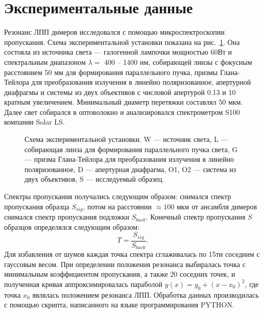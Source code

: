 \section{Экспериментальные данные}

Резонанс ЛПП димеров исследовался с помощью микроспектроскопии пропускания. Схема экспериментальной установки показана на рис.~\ref{img:expsetup}. Она состояла из источника света --- галогенной лампочки мощностью 60Вт и спектральным диапазоном $ \lambda =  $ 400 -- 1400 нм, собирающей линзы с фокусным расстоянием 50 мм для формирования параллельного пучка, призмы Глана-Тейлора для преобразования излучения в линейно поляризованное, апертурной диафрагмы и системы из двух объективов с числовой апертурой 0.13 и 10 кратным увеличением. Минимальный диаметр перетяжки составлял 50 мкм. Далее свет собирался в оптоволокно и анализировался спектрометром S100 компании Solar LS.
\begin{figure}
\caption{Схема экспериментальной установки. W --- источник света, L --- собирающая линза для формирования параллельного пучка света, G --- призма Глана-Тейлора для преобразования излучения в линейно поляризованное, D --- апертурная диафрагма, O1, O2 --- система из двух объективов, S --- исследуемый образец. }
\label{img:expsetup}
\end{figure}
Спектры пропускания получались следующим образом: снимался спектр пропускания образца $ S_{sig} $, потом на расстоянии $ \approx 100 $ мкм от ансамбля димеров снимался спектр пропускания подложки $ S_{back} $. Конечный спектр пропускания $ S $ образцов определялся следующим образом:
\begin{equation}
T = \frac{S_{sig}}{S_{back}}.
\end{equation}
Для избавления от шумов каждая точка спектра сглаживалась по 15ти соседним с гауссовым весом. При определении положения резонанса выбиралась точка с минимальным коэффициентом пропускания, а также 20 соседних точек, и полученная кривая аппроксимировалась параболой $ y(x) = y_0 + (x - x_0)^2 $, где точка $ x_0 $ являлась положением резонанса ЛПП. Обработка данных производилась с помощью скрипта, написанного на языке программирования PYTHON.

